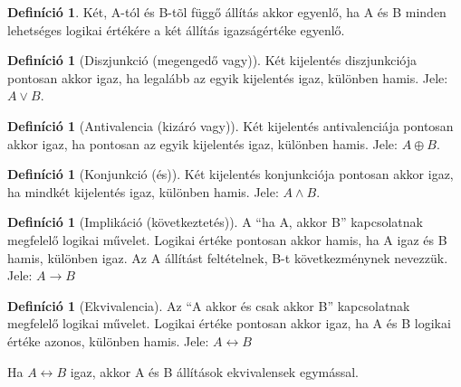 \documentclass[twoside,12pt]{report}
\theoremstyle{definition}
\newtheorem{definition}[theorem]{Definíció}
\begin{document}
	\begin{definition}
		Két, A-tól és B-tõl függő állítás akkor egyenlő, ha A és B minden lehetséges logikai
		értékére a két állítás igazságértéke egyenlő.
	\end{definition}
	\begin{definition}[Diszjunkció (megengedő vagy)]
		Két kijelentés diszjunkciója pontosan akkor igaz, ha legalább az egyik kijelentés igaz, különben hamis. Jele: $A \vee B$.
	\end{definition}
	\begin{definition}[Antivalencia (kizáró vagy)]
		Két kijelentés antivalenciája pontosan akkor igaz, ha pontosan az egyik kijelentés igaz, különben hamis. Jele: $A\oplus B$.
	\end{definition}
	\begin{definition}[Konjunkció (és)]
		Két kijelentés konjunkciója pontosan akkor igaz, ha mindkét kijelentés igaz, különben hamis. Jele: $A\wedge B$.
	\end{definition}
	\begin{definition}[Implikáció (következtetés)]
		A \enquote{ha A, akkor B} kapcsolatnak megfelelő logikai művelet. Logikai értéke pontosan akkor hamis, ha A igaz és B hamis, különben igaz. Az A állítást feltételnek, B-t következménynek nevezzük. Jele: $A\rightarrow B$
	\end{definition}
	\begin{definition}[Ekvivalencia]
		Az \enquote{A akkor és csak akkor B} kapcsolatnak megfelelő logikai művelet. Logikai értéke pontosan akkor igaz, ha A és B logikai értéke azonos, különben hamis. Jele: $A\leftrightarrow B$
	\end{definition}
	Ha $A\leftrightarrow B$ igaz, akkor A és B állítások ekvivalensek egymással.
\end{document}
